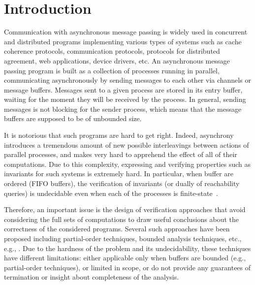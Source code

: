 \section{Introduction}

Communication with asynchronous message passing is widely used in concurrent and distributed programs implementing various types of systems such as cache coherence protocols, communication protocols, protocols for distributed agreement, web applications, device drivers, etc. 
%
An asynchronous message passing program is built as a collection of processes running in parallel, communicating asynchronously by sending messages to each other via channels or message buffers. Messages sent to a given process are stored in its entry buffer, waiting for the moment they will be received by the process. In general, sending messages is not blocking for the sender process, which means that the message buffers are supposed to be of unbounded size. 

It is notorious that such programs are hard to get right. Indeed, asynchrony introduces a tremendous amount of new possible interleavings between actions of parallel processes, and makes very hard to apprehend the effect of all of their computations. %
Due to this complexity, expressing and verifying properties such as invariants for such systems is extremely hard. In particular, when buffer are ordered (FIFO buffers), the verification of invariants (or dually of reachability queries) is undecidable even when each of the processes is finite-state~\cite{DBLP:journals/jacm/BrandZ83}.

Therefore, an important issue is the design of verification approaches that avoid considering the full sets of computations 
to draw useful conclusions about the correctness of the considered programs. Several such approaches have been proposed including partial-order techniques, bounded analysis techniques, etc., e.g., \cite{DBLP:journals/tcs/BasuB16,DBLP:conf/oopsla/Desai0M14,DBLP:conf/tacas/BouajjaniE12,DBLP:conf/tacas/TorreMP08,DBLP:conf/popl/FlanaganG05}. Due to the hardness of the problem and its undecidability, these techniques have different limitations: either applicable only when buffers are bounded (e.g., partial-order techniques), or limited in scope, or do not provide any guarantees of termination or insight about completeness of the analysis.

